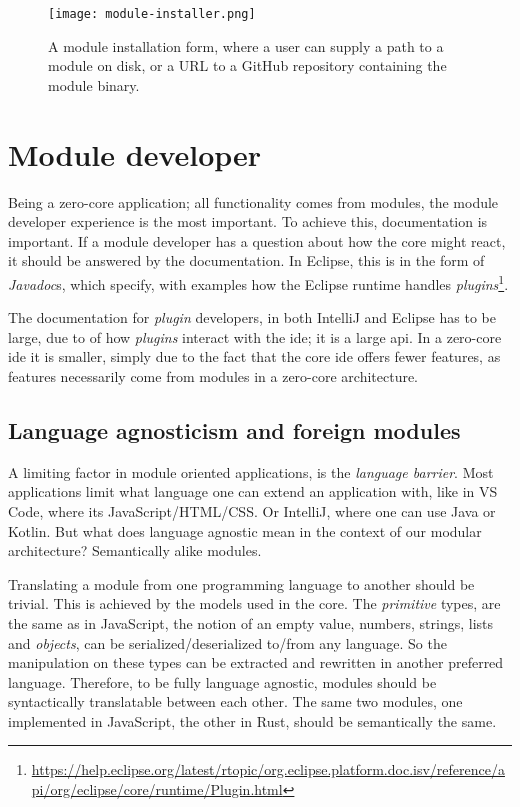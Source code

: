 \begin{figure}
  \centering
  \texttt{[image: module-installer.png]}
  \caption{
    A module installation form, where a user can supply a path to a module on
    disk, or a URL to a GitHub repository containing the module binary.
  }
  \label{pic:moduleInstaller}
\end{figure}

\section{Module developer} \label{sec:module-dev}

Being a zero-core application; all functionality comes from modules, the module
developer experience is the most important. To achieve this, documentation is
important. If a module developer has a question about how the core might react,
it should be answered by the documentation. In Eclipse, this is in the
form of \textit{Javadoc}s, which specify, with examples how the Eclipse
runtime handles \textit{plugins}\footnote{\url{https://help.eclipse.org/latest/rtopic/org.eclipse.platform.doc.isv/reference/api/org/eclipse/core/runtime/Plugin.html}}.

The documentation for \textit{plugin} developers, in both IntelliJ and
Eclipse has to be large, due to of how \textit{plugins} interact with the
\gls*{ide}; it is a large \gls*{api}. In a zero-core \gls*{ide} it is smaller,
simply due to the fact that the core \gls*{ide} offers fewer features, as features
necessarily come from modules in a zero-core architecture.


\subsection{Language agnosticism and foreign modules}

A limiting factor in module oriented applications, is the
\textit{language barrier}. Most applications limit what language one can extend
an application with, like in VS Code, where its JavaScript/HTML/CSS. Or
IntelliJ, where one can use Java or Kotlin. But what does language agnostic
mean in the context of our modular architecture? Semantically alike modules.

Translating a module from one programming language to another should be trivial.
This is achieved by the models used in the core. The \textit{primitive} types,
are the same as in JavaScript, the notion of an empty value, numbers, strings,
lists and \textit{objects}, can be serialized/deserialized to/from any language.
So the manipulation on these types can be extracted and rewritten in another
preferred language. Therefore, to be fully language agnostic, modules should be
syntactically translatable between each other. The same two modules, one
implemented in JavaScript, the other in Rust, should be semantically the same.

